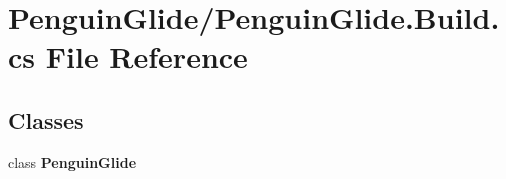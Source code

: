 \section{Penguin\+Glide/\+Penguin\+Glide.Build.\+cs File Reference}
\label{_penguin_glide_8_build_8cs}
\subsection*{Classes}
\begin{DoxyCompactItemize}
\item 
class \textbf{ Penguin\+Glide}
\end{DoxyCompactItemize}
